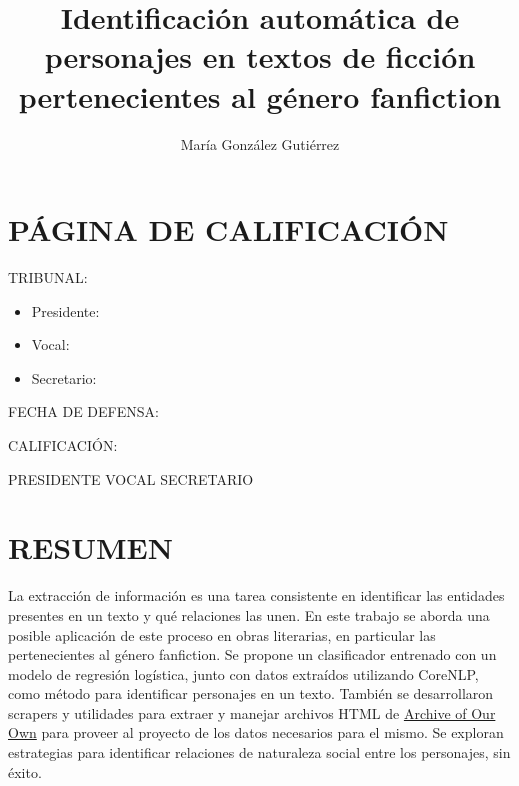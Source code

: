 \documentclass{pre-tfg}
\title{Identificación automática de personajes en textos de ficción pertenecientes al género fanfiction}
\author{María González Gutiérrez}
\begin{document}
\maketitle

\tableofcontents

\cleardoublepage

\clearpage

\cleardoublepage
\section{PÁGINA DE CALIFICACIÓN}
TRIBUNAL:
\begin{itemize}
	\item Presidente:
	\item Vocal:
	\item Secretario:
\end{itemize}
\vspace{1cm}

FECHA DE DEFENSA:


CALIFICACIÓN:

\vspace{14cm}

\small{PRESIDENTE} \hspace{4cm} \small{VOCAL}\hspace{4cm} \small{SECRETARIO}


\cleardoublepage

\section{RESUMEN}
La extracción de información es una tarea consistente en identificar las entidades presentes en un texto y qué relaciones las unen. En este trabajo se aborda una posible aplicación de este proceso en obras literarias, en particular las pertenecientes al género fanfiction. Se propone un clasificador entrenado con un modelo de regresión logística, junto con datos extraídos utilizando CoreNLP, como método para identificar personajes en un texto. También se desarrollaron scrapers y utilidades para extraer y manejar archivos HTML de \href{http://www.archiveofourown.org}{Archive of Our Own} para proveer al proyecto de los datos necesarios para el mismo. Se exploran estrategias para identificar relaciones de naturaleza social entre los personajes, sin éxito.

\cleardoublepage
\end{document}
